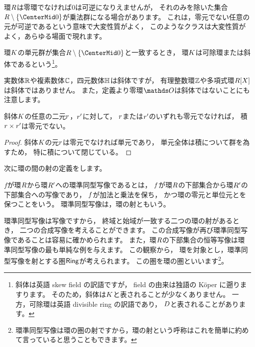 環\(\Ring\)は零環でなければ\(0\)は可逆になりえませんが，
それのみを除いた集合\(\Ring\setminus\Set{0}\)が乗法群になる場合があります。
これは，零元でない任意の元が可逆であるという意味で大変性質がよく，
このようなクラスは大変性質がよく，あらゆる場面で現れます。
\begin{definition}
    環\(\Field\)の単元群が集合\(\Ring\setminus\Set{0}\)と一致するとき，
    環\(\Field\)は可除環または斜体であるという\footnote{
        斜体は英語 skew field の訳語ですが，
        field の由来は独語の K\"{o}per に遡りますります。
        そのため，斜体は\(\Field\)と表されることが少なくありません。
        一方，可除環は英語 divisible ring の訳語であり，
        \(\DivisibleRing\)と表されることがあります。
    }。
\end{definition}
実数体\(\mathbb{R}\)や複素数体\(\mathbb{C}\)，四元数体\(\mathbb{H}\)は斜体ですが，
有理整数環\(\mathbb{Z}\)や多項式環\(\PolynomialRing{\Ring}[X]\)は斜体ではありません。
また，定義より零環\(\ZeroRing\)は斜体ではないことにも注意します。

\begin{proposition}
    斜体\(\Field\)の任意の二元\(\Element<r>\)，\(\Element<r'>\)に対して，
    \(\Element<r>\)または\(\Element<r'>\)のいずれも零元でなければ，
    積\(\Element<r>\times\Element<r'>\)は零元でない。
\end{proposition}

\begin{proof}
    斜体\(\Field\)の元\(\Element<r>\)は零元でなければ単元であり，
    単元全体は積について群を為すため，
    特に積について閉じている。
\end{proof}

次に環の間の射の定義をします。

\begin{definition}
    \(f\)が環\(\Ring\)から環\(\Ring'\)への環準同型写像であるとは，
    \(\Map\)が環\(\Ring\)の下部集合から環\(\Ring'\)の下部集合への写像であり，
    \(\Map\)が加法と乗法を保ち，
    かつ環の零元と単位元とを保つことをいう。
    環準同型写像は，環の射ともいう。
\end{definition}

環準同型写像は写像ですから，
終域と始域が一致する二つの環の射があるとき，
二つの合成写像を考えることができます。
この合成写像が再び環準同型写像であることは容易に確かめられます。
また，環\(\Ring\)の下部集合の恒等写像は環準同型写像の最も単純な例を与えます。
この観察から，
環を対象とし，環準同型写像を射とする圏\(\mathsf{Ring}\)が考えられます。
この圏を環の圏といいます\footnote{環準同型写像は環の圏の射ですから，環の射という呼称はこれを簡単に約めて言っていると思うこともできます。}。

